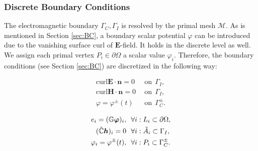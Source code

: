 \documentclass{article}
\begin{document}
\subsubsection{Discrete Boundary Conditions}
The electromagnetic boundary $\Gamma_C, \Gamma_I$ is resolved by the primal mesh $\mathcal{M}$. As is mentioned in Section \ref{sec:BC}, a boundary scalar potential $\varphi$ can be introduced due to the vanishing surface curl of $\mathbf{E}$-field. It holds in the discrete level as well. We assign each primal vertex $P_i \in \partial\Omega$ a scalar value $\varphi_i$. Therefore, the boundary conditions (see Section \ref{sec:BC}) are discretized in the following way:
\begin{center}
    \vspace{-0.5cm}
    \begin{minipage}{0.3\textwidth}
    \begin{align*}
    \text{curl} \mathbf{E} \cdot \mathbf{n} = 0\ \ &\text{on} \ \  \Gamma_I,  \\
    \text{curl} \mathbf{H} \cdot \mathbf{n} = 0\ \  &\text{on} \ \  \Gamma_I, \\
    \varphi = \varphi^\pm(t)\ \ &\text{on} \ \ \Gamma_C^\pm.
    \end{align*}
    \end{minipage}
    \begin{minipage}{0.1\textwidth}
    \centering
    \end{minipage}
    \begin{minipage}{0.4\textwidth}
        \begin{subequations}
            \begin{align}
            e_i = (\mathbb{G}\bm{\varphi})_i,\ \ &\forall i : L_i \subset \partial\Omega, \label{equ:bc_2}\\
            (\Tilde{\mathbb{C}} \bm{h})_i = 0\ \ &\forall i : \Tilde{A}_i \subset \Gamma_I,\label{equ:bc_3} \\
            \varphi_i = \varphi^\pm(t), \ \ &\forall i : P_i \subset \Gamma_C^\pm. \label{equ:bc_1}
            \end{align}
        \end{subequations}
    \end{minipage}
\end{center}
\end{document}
